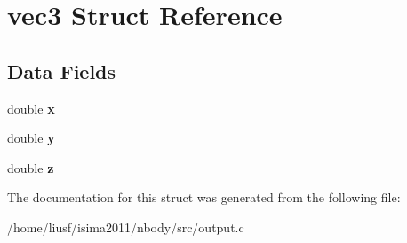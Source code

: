 \hypertarget{structvec3}{
\section{vec3 Struct Reference}
\label{structvec3}
}
\subsection*{Data Fields}
\begin{DoxyCompactItemize}
\item 
\hypertarget{structvec3_ae25ebf32c019afc408f51f6117558365}{
double {\bfseries x}}
\label{structvec3_ae25ebf32c019afc408f51f6117558365}

\item 
\hypertarget{structvec3_a9c3ca9a994470ce9bc9fee5963439fba}{
double {\bfseries y}}
\label{structvec3_a9c3ca9a994470ce9bc9fee5963439fba}

\item 
\hypertarget{structvec3_a2b02670cfe437ee01416916bac917584}{
double {\bfseries z}}
\label{structvec3_a2b02670cfe437ee01416916bac917584}

\end{DoxyCompactItemize}


The documentation for this struct was generated from the following file:\begin{DoxyCompactItemize}
\item 
/home/liusf/isima2011/nbody/src/output.c\end{DoxyCompactItemize}
